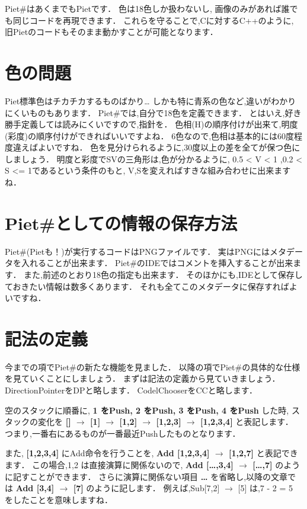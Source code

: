 Piet\#はあくまでもPietです． 色は18色しか扱わないし,
画像のみがあれば誰でも同じコードを再現できます．
これらを守ることで,Cに対するC++のように,
旧Pietのコードもそのまま動かすことが可能となります．

\section{色の問題}

Piet標準色はチカチカするものばかり\ldots{}
しかも特に青系の色など,違いがわかりにくいものもあります．
Piet\#では,自分で18色を定義できます．
とはいえ,好き勝手定義しては読みにくいですので,指針を．
色相(H)の順序付けが出来て,明度(彩度)の順序付けができればいいですよね．
6色なので,色相は基本的には60度程度違えばよいですね．
色を見分けられるように,30度以上の差を全てが保つ色にしましょう．
明度と彩度でSVの三角形は,色が分かるように, 0.5 \textless{} V \textless{}
1 ,0.2 \textless{} S \textless{}= 1であるという条件のもと,
V,Sを変えればすきな組み合わせに出来ますね．

\section{Piet\#としての情報の保存方法}

Piet\#(Pietも！)が実行するコードはPNGファイルです．
実はPNGにはメタデータを入れることが出来ます．
Piet\#のIDEではコメントを挿入することが出来ます．
また,前述のとおり18色の指定も出来ます．
そのほかにも,IDEとして保存しておきたい情報は数多くあります．
それも全てこのメタデータに保存すればよいですね．

\section{記法の定義}

今までの項でPiet\#の新たな機能を見ました．
以降の項でPiet\#の具体的な仕様を見ていくことにしましょう．
まずは記法の定義から見ていきましょう． DirectionPointerをDPと略します．
CodelChooserをCCと略します．

空のスタックに順番に, \textbf{1 をPush, 2 をPush, 3 をPush, 4 をPush}
した時, スタックの変化を \textbf{{[}{]} $\to$ {[}1{]}
$\to$ {[}1,2{]} $\to$ {[}1,2,3{]} $\to$
{[}1,2,3,4{]}} と表記します．
つまり,一番右にあるものが一番最近Pushしたものとなります．

また, \textbf{{[}1,2,3,4{]}} にAdd命令を行うことを, \textbf{Add
{[}1,2,3,4{]} $\to$ {[}1,2,7{]}} と表記できます． この場合,1,2
は直接演算に関係ないので, \textbf{Add {[}\ldots{},3,4{]} $\to$
{[}\ldots{},7{]}} のように記すことができます． さらに演算に関係ない項目
\textbf{\ldots{}} を省略し,以降の文章では \textbf{Add {[}3,4{]}
$\to$ {[}7{]}} のように記します． 例えば,Sub{[}7,2{]}
$\to$ {[}5{]} は,7 - 2 = 5 をしたことを意味しますね．

